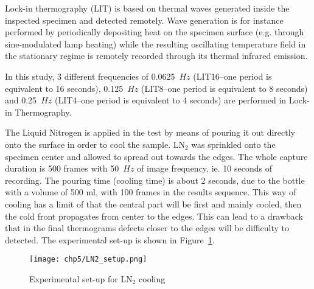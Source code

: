 
Lock-in thermography (LIT) is based on thermal waves generated inside the inspected specimen and detected remotely. Wave generation is for instance performed by periodically depositing heat on the specimen surface (e.g. through sine-modulated lamp heating) while the resulting oscillating temperature field in the stationary regime is remotely recorded through its thermal infrared emission.

In this study, 3 different frequencies of 0.0625~$Hz$ (LIT16--one period is equivalent to 16 seconds), 0.125~$Hz$ (LIT8--one period is equivalent to 8 seconds) and 0.25~$Hz$ (LIT4--one period is equivalent to 4 seconds) are performed in Lock-in Thermography. 


The Liquid Nitrogen is applied in the test by means of pouring it out directly onto the surface in order to cool the sample. LN$_2$ was sprinkled onto the specimen center and allowed to spread out towards the edges. The whole capture duration is 500 frames with 50~$Hz$ of image frequency, ie. 10 seconds of recording. The pouring time (cooling time) is about 2 seconds, due to the bottle with a volume of 500 ml, with 100 frames in the results sequence. This way of cooling has a limit of that the central part will be first and mainly cooled, then the cold front propagates from center to the edges. This can lead to a drawback that in the final thermograms defects closer to the edges will be difficulty to detected. The experimental set-up is shown in Figure~\ref{Exp_LN2}.

\begin{figure}[ht]
   \centering
   \texttt{[image: chp5/LN2\_setup.png]}
   \caption{Experimental set-up for LN$_2$ cooling}
   \label{Exp_LN2}
\end{figure}

